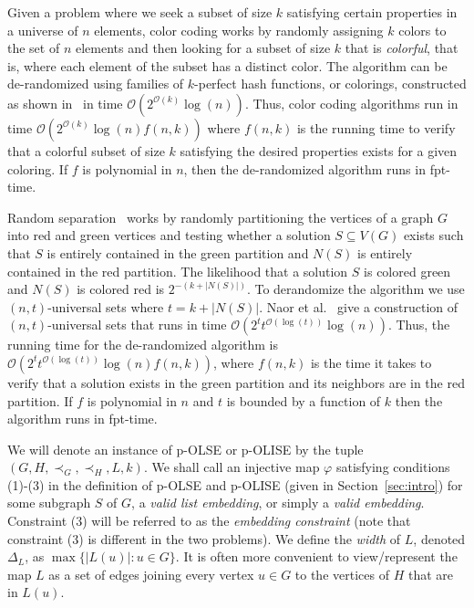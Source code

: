 \documentclass[11pt]{article}
\newcommand{\Oh}{{\mathcal O}}
\let\phi=\varphi
\begin{document}
Given a problem where we seek a subset of size $k$ satisfying certain properties in a universe of $n$ elements, color coding works by randomly assigning $k$ colors to the set of $n$ elements and then looking for a subset of size $k$ that is {\em colorful}, that is, where each element of the subset has a distinct color.  The algorithm can be de-randomized using families of $k$-perfect hash functions, or colorings, constructed as shown in~\cite{alon95} in time $\Oh(2^{\Oh(k)}\log(n))$. Thus, color coding algorithms run in time $\Oh(2^{\Oh(k)}\log(n)f(n,k))$ where $f(n, k)$ is the running time to verify that a colorful subset of size $k$ satisfying the desired properties exists for a given coloring.  If $f$ is polynomial in $n$, then the de-randomized algorithm runs in fpt-time.

Random separation~\cite{cai} works by randomly partitioning the vertices of a graph $G$ into red and green vertices and testing whether a solution $S \subseteq V(G)$ exists such that $S$ is entirely contained in the green partition and $N(S)$ is entirely contained in the red partition.  The likelihood that a solution $S$ is colored green and $N(S)$ is colored red is $2^{-(k+|N(S)|)}$.  To derandomize the algorithm we use $(n,t)$-universal sets where $t = k+|N(S)|$.  Naor et al.~\cite{naor} give a construction of $(n,t)$-universal sets that runs in time $\Oh(2^tt^{\Oh(\log(t))}\log(n))$.  Thus, the running time for the de-randomized algorithm is $\Oh(2^tt^{\Oh(\log(t))}\log(n)f(n,k))$, where $f(n,k)$ is the time it takes to verify that a solution exists in the green partition and its neighbors are in the red partition.  If $f$ is polynomial in $n$ and $t$ is bounded by a function of $k$ then the algorithm runs in fpt-time.

We will denote an instance of p-OLSE or p-OLISE by the tuple $(G, H, \prec_G, \prec_H, L, k)$. We shall call an injective map $\phi$ satisfying conditions (1)-(3) in the definition of p-OLSE and p-OLISE (given in Section~\ref{sec:intro}) for some subgraph $S$ of $G$, a {\em valid list embedding}, or simply a {\em valid embedding}. Constraint (3) will be referred to as the {\em embedding constraint} (note that constraint (3) is different in the two problems). We define the {\em width} of $L$, denoted $\Delta_L$, as $\max\{|L(u)| : u \in G\}$. It is often more convenient to view/represent the map $L$ as a set of edges joining every vertex $u \in G$ to the vertices of $H$ that are in $L(u)$.
\end{document}
